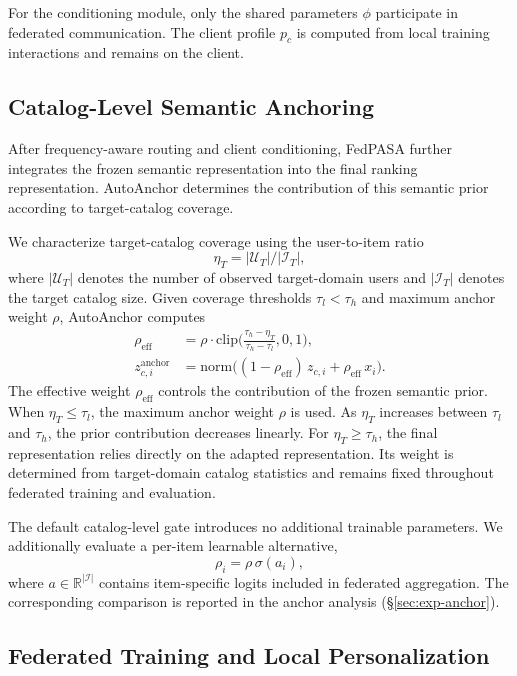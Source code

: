 For the conditioning module, only the shared parameters $\phi$ participate in federated communication. The client profile $p_c$ is computed from local training interactions and remains on the client.

\subsection{Catalog-Level Semantic Anchoring}
\label{sec:anchor}

After frequency-aware routing and client conditioning, FedPASA further integrates the frozen semantic representation into the final ranking representation. AutoAnchor determines the contribution of this semantic prior according to target-catalog coverage.

We characterize target-catalog coverage using the user-to-item ratio
\[
\eta_T=|\mathcal{U}_T|/|\mathcal{I}_T|,
\]
where $|\mathcal{U}_T|$ denotes the number of observed target-domain users and $|\mathcal{I}_T|$ denotes the target catalog size. Given coverage thresholds $\tau_l<\tau_h$ and maximum anchor weight $\rho$, AutoAnchor computes
\begin{equation}
\begin{aligned}
\rho_{\mathrm{eff}}&=\rho\cdot\mathrm{clip}\!\Big(\frac{\tau_h-\eta_T}{\tau_h-\tau_l},0,1\Big),\\
z^{\mathrm{anchor}}_{c,i}&=\mathrm{norm}\big((1-\rho_{\mathrm{eff}})\,z_{c,i}+\rho_{\mathrm{eff}}\,x_i\big).
\end{aligned}
\label{eq:anchor}
\end{equation}
The effective weight $\rho_{\mathrm{eff}}$ controls the contribution of the frozen semantic prior. When $\eta_T\leq\tau_l$, the maximum anchor weight $\rho$ is used. As $\eta_T$ increases between $\tau_l$ and $\tau_h$, the prior contribution decreases linearly. For $\eta_T\geq\tau_h$, the final representation relies directly on the adapted representation. Its weight is determined from target-domain catalog statistics and remains fixed throughout federated training and evaluation.

The default catalog-level gate introduces no additional trainable parameters. We additionally evaluate a per-item learnable alternative,
\[
\rho_i=\rho\,\sigma(a_i),
\]
where $a\in\mathbb{R}^{|\mathcal{I}|}$ contains item-specific logits included in federated aggregation. The corresponding comparison is reported in the anchor analysis (\S\ref{sec:exp-anchor}).

\subsection{Federated Training and Local Personalization}
\label{sec:training}

